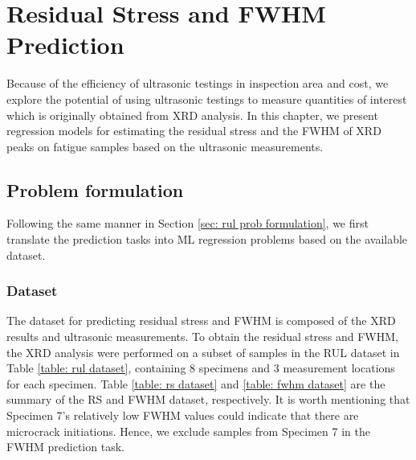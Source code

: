 \chapter{Residual Stress and FWHM Prediction}
\label{chap: reg}

Because of the efficiency of ultrasonic testings in inspection area and cost, we explore the potential of using ultrasonic testings to measure quantities of interest which is originally obtained from XRD analysis. In this chapter, we present regression models for estimating the residual stress and the FWHM of XRD peaks on fatigue samples based on the ultrasonic measurements. 

\section{Problem formulation}
Following the same manner in Section \ref{sec: rul prob formulation}, we first translate the prediction tasks into ML regression problems based on the available dataset.

\subsection{Dataset}
The dataset for predicting residual stress and FWHM is composed of the XRD results and ultrasonic measurements. To obtain the residual stress and FWHM, the XRD analysis were performed on a subset of samples in the RUL dataset in Table \ref{table: rul dataset}, containing 8 specimens and 3 measurement locations for each specimen. Table \ref{table: rs dataset} and \ref{table: fwhm dataset} are the summary of the RS and FWHM dataset, respectively. It is worth mentioning that Specimen 7's relatively low FWHM values could indicate that there are microcrack initiations. Hence, we exclude samples from Specimen 7 in the FWHM prediction task.

